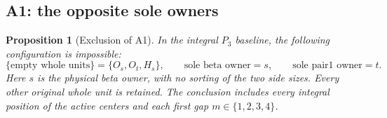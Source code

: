 \documentclass[11pt,letterpaper]{article}
\newtheorem{proposition}[theorem]{Proposition}
\theoremstyle{definition}\newtheorem{definition}[theorem]{Definition}
\begin{document}
\subsection{A1: the opposite sole owners}\label{subsec:p3-a1}

\begin{proposition}[Exclusion of A1]\label{prop:p3-a1}
In the integral $P_3$ baseline, the following configuration is impossible:
\[
 \{\text{empty whole units}\}=\{O_s,O_t,H_s\},\qquad
 \text{sole beta owner}=s,\qquad
 \text{sole pair1 owner}=t.
\]
Here $s$ is the physical beta owner, with no sorting of the two side
sizes. Every other original whole unit is retained. The conclusion
includes every integral position of the active centers and each first
gap $m\in\{1,2,3,4\}$.
\end{proposition}
\end{document}
